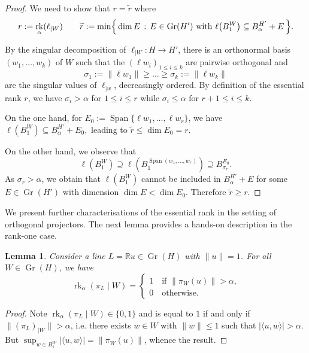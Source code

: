 \documentclass[a4paper,english]{amsart}
\newtheorem{lemma}[thm]{Lemma}
\theoremstyle{definition}
\newcommand{\R}{\mathbb{R}}
\newcommand{\1}{\mathbbm{1}}
\DeclareMathOperator{\Span}{Span}
\DeclareMathOperator{\rk}{rk}
\newcommand{\norm}[1]{\lVert#1\rVert}   %
\newcommand{\setBig}[1]{\Bigl\{\, #1 \,\Bigr\}}
\DeclareMathOperator{\Gr}{Gr}
\renewcommand{\subset}{\subseteq}
\begin{document}
\begin{proof}
We need to show that $r=\widetilde r$ where
\[
r:=\rk_\alpha(\ell_{|W})  \quad \quad \widetilde{r}:=\min \setBig{\dim E \,:\, E \in \Gr(H') \text{ with } \ell \bigl(B^W_1\bigr) \subseteq B^{H'}_\alpha + E}.
\]



By the singular decomposition of $\ell_{|W} : H \to H'$, there is an orthonormal basis $(w_1, \dotsc, w_k)$ of $W$ such that the $(\ell w_i)_{1\leq i \leq k}$ are pairwise orthogonal and
\[
\sigma_1 := \norm{\ell w_1} \geq \dots \geq \sigma_k :=\norm{\ell w_k}
\]
are the singular values of $\ell_{|w}$, decreasingly ordered.
By definition of the essential rank $r$, we have $\sigma_i > \alpha$ for $1 \leq i \leq r$ while $\sigma_i \leq \alpha$ for $r + 1 \leq i \leq k$.

On the one hand, for $E_0 := \Span\{\ell w_1, \dotsc, \ell w_r \}$, we have
\(
\ell(B_1^W) \subset B^{H'}_\alpha + E_0,
\)
leading to $\widetilde r \leq \dim E_0 = r $.


On the other hand, we observe that
$$\ell(B^W_{1})\supseteq \ell(B^{\Span(w_{1}, \dots, w_{r})}_{1}) \supseteq B^{E_{0}}_{\sigma_{r}}.$$
As $\sigma_{r}>\alpha$, we obtain that $\ell(B^W_{1})$ cannot be included in  $B_\alpha^{H'} + E$ for some $E\in \Gr(H')$ with dimension $\dim E<\dim E_{0}$. Therefore $\widetilde{r}\geq r$.
\end{proof}

\bigskip

We present further characterisations of the essential rank in the setting of orthogonal projectors.
The next lemma provides a hands-on description in the rank-one case.

\begin{lemma}
 \label{ex-essrank-lines}
Consider a line $L =\R u\in \Gr(H)$  with $\|u\|=1$. For all $W \in \Gr(H)$,  we have
\[
\rk_\alpha(\pi_L \mid W) = \begin{cases}
1 \quad \text{if $\norm{\pi_W(u)} > \alpha$,}\\
0 \quad \text{otherwise.}
\end{cases}
\]
\end{lemma}
\begin{proof}
 Note $\rk_\alpha(\pi_L \mid W)\in \{0, 1\}$ and is equal to $1$ if and only if $\|(\pi_{L})_{|W}\|>\alpha$, i.e. there exists $w\in W$ with $\|w\|\leq 1$ such that $|\langle u, w \rangle|>\alpha$. But $\sup_{w \in B^W_{1}}|\langle u, w \rangle|= \|\pi_{W}(u)\|$, whence the result.
\end{proof}
\end{document}

